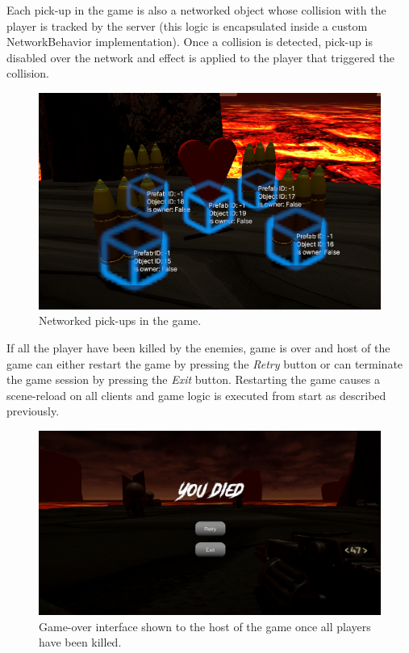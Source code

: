 \documentclass[times, utf8, diplomski]{fer}
\begin{document}
Each pick-up in the game is also a networked object whose collision with the player is tracked by the server (this logic is encapsulated inside a custom NetworkBehavior implementation). Once a collision is detected, pick-up is disabled over the network and effect is applied to the player that triggered the collision.

\begin{figure}[H]
	\centering
	\includegraphics[scale=0.8]{Game-pick-ups-networked}
	\caption{Networked pick-ups in the game.}
\end{figure}

If all the player have been killed by the enemies, game is over and host of the game can either restart the game by pressing the \textit{Retry} button or can terminate the game session by pressing the \textit{Exit} button. Restarting the game causes a scene-reload on all clients and game logic is executed from start as described previously.

\begin{figure}[H]
	\centering
	\includegraphics[scale=0.5]{Game-over}
	\caption{Game-over interface shown to the host of the game once all players have been killed.}
\end{figure}
\end{document}
